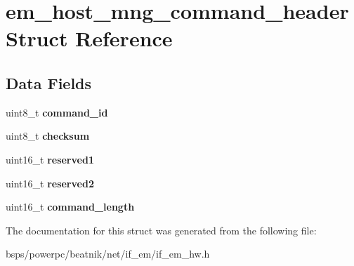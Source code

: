 \hypertarget{structem__host__mng__command__header}{}\section{em\+\_\+host\+\_\+mng\+\_\+command\+\_\+header Struct Reference}
\label{structem__host__mng__command__header}
\subsection*{Data Fields}
\begin{DoxyCompactItemize}
\item 
\mbox{\label{structem__host__mng__command__header_ae70ff12f1ed6e166b9ade15439dc3f21}} 
uint8\+\_\+t {\bfseries command\+\_\+id}
\item 
\mbox{\label{structem__host__mng__command__header_a14ada2022cf86bf0a91de44d4797db43}} 
uint8\+\_\+t {\bfseries checksum}
\item 
\mbox{\label{structem__host__mng__command__header_af2267b001b2a4a71bc00d1073df16fbc}} 
uint16\+\_\+t {\bfseries reserved1}
\item 
\mbox{\label{structem__host__mng__command__header_a7d21b24e6f3d7bfe399516fe22b4e770}} 
uint16\+\_\+t {\bfseries reserved2}
\item 
\mbox{\label{structem__host__mng__command__header_afed1c327c9aac731c081b5b27f68f51b}} 
uint16\+\_\+t {\bfseries command\+\_\+length}
\end{DoxyCompactItemize}


The documentation for this struct was generated from the following file\+:\begin{DoxyCompactItemize}
\item 
bsps/powerpc/beatnik/net/if\+\_\+em/if\+\_\+em\+\_\+hw.\+h\end{DoxyCompactItemize}
